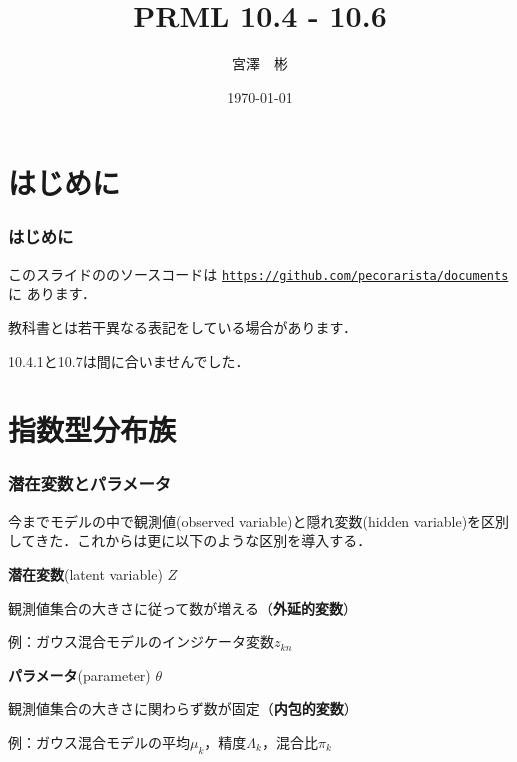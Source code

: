 \documentclass[10pt,hyperref={unicode}]{beamer}
\title{PRML 10.4 - 10.6}
\institute{総合研究大学院大学 博士前期1年\newline\newline\texttt{miyazawa-a@nii.ac.jp}}
\author{宮澤　彬}
\date{\today}
\newenvironment{wideitemize}{\itemize\addtolength{\itemsep}{1em}}{\enditemize}
\begin{document}
\setlength{\jot}{1.5\jot}
\nocite{bishop2008}
\begin{frame}
\maketitle
\end{frame}


\section{はじめに}

\begin{frame}
    \frametitle{はじめに}
    \begin{wideitemize}
        \item このスライドの{\LuaLaTeX}のソースコードは
            \href{https://github.com/pecorarista/documents}{\texttt{https://github.com/pecorarista/documents}}に
            あります．
        \item 教科書とは若干異なる表記をしている場合があります．
        \item 10.4.1と10.7は間に合いませんでした．
    \end{wideitemize}
\end{frame}

\section{指数型分布族}

\begin{frame}
\frametitle{潜在変数とパラメータ}
今までモデルの中で観測値(observed variable)と隠れ変数(hidden variable)を区別してきた．これからは更に以下のような区別を導入する．

\bigskip

\begin{wideitemize}
    \item \textbf{潜在変数}(latent variable) $Z$

        観測値集合の大きさに従って数が増える（\textbf{外延的変数}）

        例：ガウス混合モデルのインジケータ変数$z_{kn}$

    \item \textbf{パラメータ}(parameter) $\theta$

        観測値集合の大きさに関わらず数が固定（\textbf{内包的変数}）

        例：ガウス混合モデルの平均$\mu_k$，精度$\varLambda_k$，混合比$\pi_k$
\end{wideitemize}
\end{frame}
\end{document}
